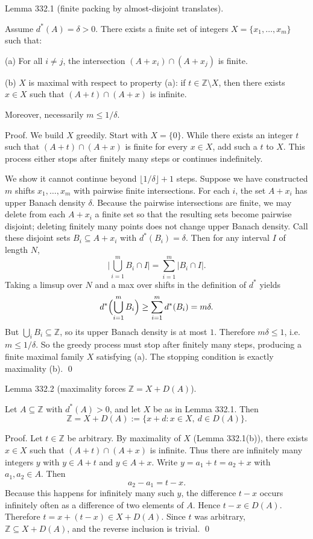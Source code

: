 Lemma 332.1 (finite packing by almost-disjoint translates).

Assume $d^*(A)=\delta>0$.
There exists a finite set of integers $X=\{x_1,\dots,x_m\}$ such that:

(a) For all $i\neq j$, the intersection $(A+x_i)\cap(A+x_j)$ is finite.

(b) $X$ is maximal with respect to property (a): if $t\in\mathbb Z\setminus X$, then there exists $x\in X$ such that $(A+t)\cap(A+x)$ is infinite.

Moreover, necessarily $m\le 1/\delta$.

Proof.
We build $X$ greedily.
Start with $X=\{0\}$. While there exists an integer $t$ such that $(A+t)\cap(A+x)$ is finite for every $x\in X$, add such a $t$ to $X$.
This process either stops after finitely many steps or continues indefinitely.

We show it cannot continue beyond $\lfloor 1/\delta\rfloor+1$ steps.
Suppose we have constructed $m$ shifts $x_1,\dots,x_m$ with pairwise finite intersections.
For each $i$, the set $A+x_i$ has upper Banach density $\delta$.
Because the pairwise intersections are finite, we may delete from each $A+x_i$ a finite set so that the resulting sets become pairwise disjoint; deleting finitely many points does not change upper Banach density.
Call these disjoint sets $B_i\subseteq A+x_i$ with $d^*(B_i)=\delta$.
Then for any interval $I$ of length $N$,
\[
\bigl|\bigcup_{i=1}^m B_i\cap I\bigr| = \sum_{i=1}^m |B_i\cap I|.
\]
Taking a limsup over $N$ and a max over shifts in the definition of $d^*$ yields
\[
d^*\Bigl(\bigcup_{i=1}^m B_i\Bigr) \ge \sum_{i=1}^m d^*(B_i)=m\delta.
\]
But $\bigcup_i B_i\subseteq\mathbb Z$, so its upper Banach density is at most $1$.
Therefore $m\delta\le 1$, i.e. $m\le 1/\delta$.
So the greedy process must stop after finitely many steps, producing a finite maximal family $X$ satisfying (a).
The stopping condition is exactly maximality (b).
\qed


Lemma 332.2 (maximality forces $\mathbb Z=X+D(A)$).

Let $A\subseteq\mathbb Z$ with $d^*(A)>0$, and let $X$ be as in Lemma 332.1.
Then
\[
\mathbb Z = X + D(A):=\{x+d: x\in X,\ d\in D(A)\}.
\]

Proof.
Let $t\in\mathbb Z$ be arbitrary.
By maximality of $X$ (Lemma 332.1(b)), there exists $x\in X$ such that $(A+t)\cap(A+x)$ is infinite.
Thus there are infinitely many integers $y$ with $y\in A+t$ and $y\in A+x$.
Write $y=a_1+t=a_2+x$ with $a_1,a_2\in A$.
Then
\[
a_2-a_1 = t-x.
\]
Because this happens for infinitely many such $y$, the difference $t-x$ occurs infinitely often as a difference of two elements of $A$.
Hence $t-x\in D(A)$.
Therefore $t=x+(t-x)\in X+D(A)$.
Since $t$ was arbitrary, $\mathbb Z\subseteq X+D(A)$, and the reverse inclusion is trivial. \qed



